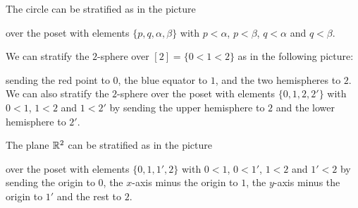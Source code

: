 \begin{exmp}
The circle can be stratified as in the picture
\begin{center}
\end{center}
over the poset with elements \(\{p,q,\alpha,\beta\}\) with \(p<\alpha\), \(p<\beta\), \(q<\alpha\) and \(q<\beta\).
\end{exmp}

\begin{exmp}
We can stratify the \(2\)-sphere over \([2]=\{0<1<2\}\) as in the following picture:
\begin{center}
\end{center}
sending the red point to \(0\), the blue equator to \(1\), and the two hemispheres to \(2\).
We can also stratify the \(2\)-sphere over the poset with elements \(\{0,1,2,2'\}\) with \(0<1\), \(1<2\) and \(1<2'\) by sending the upper hemisphere to \(2\) and the lower hemisphere to \(2'\).
\end{exmp}

\begin{exmp}
The plane \(\mathbb{R}^2\) can be stratified as in the picture
\begin{center}
\end{center}
over the poset with elements \(\{0,1,1',2\}\) with \(0<1\), \(0<1'\), \(1<2\) and \(1'<2\) by sending the origin to \(0\), the \(x\)-axis minus the origin to \(1\), the \(y\)-axis minus the origin to \(1'\) and the rest to \(2\).
\end{exmp}

